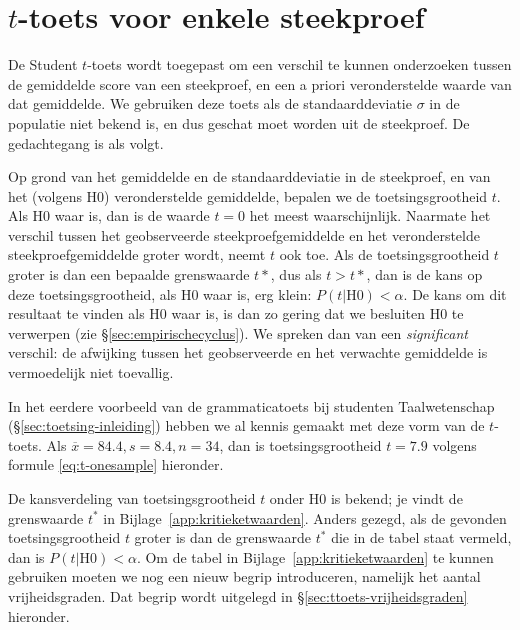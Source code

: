 \documentclass[
]{book}
\begin{document}
\hypertarget{sec:ttoets-onesample}{%
\section{\texorpdfstring{\(t\)-toets voor enkele steekproef}{t-toets voor enkele steekproef}}\label{sec:ttoets-onesample}}

De Student \(t\)-toets wordt toegepast om een verschil te kunnen onderzoeken tussen
de gemiddelde score van een steekproef, en een a priori veronderstelde
waarde van dat gemiddelde. We gebruiken deze toets als de
standaarddeviatie \(\sigma\) in de populatie niet bekend is, en dus
geschat moet worden uit de steekproef. De gedachtegang is als volgt.

Op grond van het gemiddelde en de standaarddeviatie in de steekproef, en
van het (volgens H0) veronderstelde gemiddelde, bepalen we de toetsingsgrootheid \(t\).
Als H0 waar is, dan is de waarde \(t=0\) het meest waarschijnlijk.
Naarmate het verschil tussen het geobserveerde steekproefgemiddelde en
het veronderstelde steekproefgemiddelde groter wordt, neemt \(t\) ook toe.
Als de toetsingsgrootheid \(t\) groter is dan een bepaalde grenswaarde
\(t*\), dus als \(t>t*\), dan is de kans op deze toetsingsgrootheid, als H0
waar is, erg klein: \(P(t|\textrm{H0}) < \alpha\). De kans om dit
resultaat te vinden als H0 waar is, is dan zo gering dat we besluiten H0
te verwerpen (zie
§\ref{sec:empirischecyclus}). We spreken dan van een \emph{significant}
verschil: de afwijking tussen het geobserveerde en het verwachte
gemiddelde is vermoedelijk niet toevallig.

In het eerdere voorbeeld van de grammaticatoets bij studenten
Taalwetenschap (§\ref{sec:toetsing-inleiding}) hebben we al kennis gemaakt met
deze vorm van de \(t\)-toets.
Als \(\overline{x}=84.4, s=8.4, n=34\), dan is
toetsingsgrootheid \(t=7.9\) volgens formule \eqref{eq:t-onesample} hieronder.

De kansverdeling van toetsingsgrootheid \(t\) onder H0 is bekend; je vindt
de grenswaarde \(t^*\) in
Bijlage~\ref{app:kritieketwaarden}. Anders gezegd, als de gevonden
toetsingsgrootheid \(t\) groter is dan de grenswaarde \(t^*\) die in de
tabel staat vermeld, dan is \(P(t|\textrm{H0})<\alpha\). Om de tabel in
Bijlage~\ref{app:kritieketwaarden} te kunnen gebruiken moeten we nog een
nieuw begrip introduceren, namelijk het aantal vrijheidsgraden. Dat
begrip wordt uitgelegd in
§\ref{sec:ttoets-vrijheidsgraden} hieronder.
\end{document}

